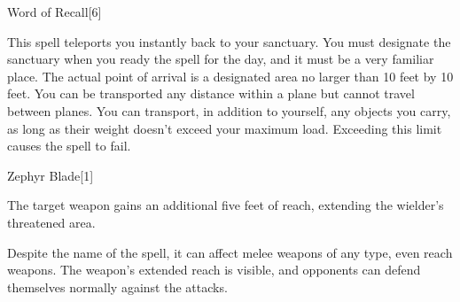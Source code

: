 \begin{spellsection}{Word of Recall}[6]
    \begin{spellheader}
    \end{spellheader}
    \begin{spellcontent}
        \begin{spelltargetinginfo}
        \end{spelltargetinginfo}
        \begin{spelleffects}
            \spelleffect This spell teleports you instantly back to your sanctuary. You must designate the sanctuary when you ready the spell for the day, and it must be a very familiar place. The actual point of arrival is a designated area no larger than 10 feet by 10 feet. You can be transported any distance within a plane but cannot travel between planes. You can transport, in addition to yourself, any objects you carry, as long as their weight doesn't exceed your maximum load. Exceeding this limit causes the spell to fail.
        \end{spelleffects}
    \end{spellcontent}
    \begin{spellfooter}
        \miscastexplode
    \end{spellfooter}
\end{spellsection}

\begin{spellsection}{Zephyr Blade}[1]
    \begin{spellheader}
    \end{spellheader}
    \begin{spellcontent}
        \begin{spelltargetinginfo}
        \end{spelltargetinginfo}
        \begin{spelleffects}
            \spelleffect The target weapon gains an additional five feet of reach, extending the wielder's threatened area.
            \spelldur \durpersonallong
        \end{spelleffects}
    \end{spellcontent}
    \begin{spellfooter}
        \spellnotes Despite the name of the spell, it can affect melee weapons of any type, even reach weapons. The weapon's extended reach is visible, and opponents can defend themselves normally against the attacks.
        \miscastexplode
    \end{spellfooter}
\end{spellsection}

